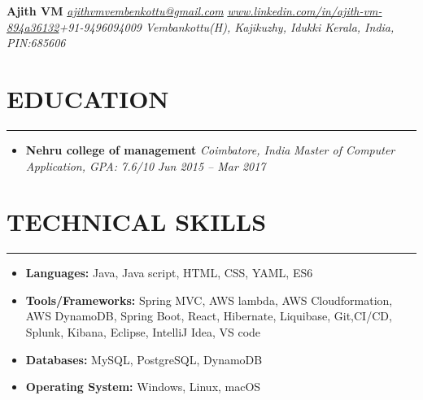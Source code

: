 \documentclass{article}
\begin{document}
	\noindent \textbf{\LARGE Ajith VM} \hfill \textcolor{cyan}{\underline{\textit{\href{mailto:ajithvmvembenkottu@gmail.com}{ajithvmvembenkottu@gmail.com}}}}\newline
	\textcolor{cyan}{\underline{\textit{\url{www.linkedin.com/in/ajith-vm-894a36132}}}}\hfill \textit{+91-9496094009}\newline
	\null\hfill \textit{Vembankottu(H), Kajikuzhy, Idukki \newline \null\hfill Kerala, India, PIN:685606}
	\section*{\normalsize EDUCATION}
	\rule{\textwidth}{1.6pt}
		\begin{itemize}
			\item \textbf{\normalsize Nehru college of management} \hfill \textit{Coimbatore, India} \newline \textit{Master of Computer Application, GPA: 7.6/10} \hfill \textit{Jun 2015 – Mar 2017}
		\end{itemize}
	\section*{\normalsize TECHNICAL SKILLS}
	\rule{\textwidth}{1.6pt}
		\begin{itemize}
			\item \textbf{Languages:} Java, Java script, HTML, CSS, YAML, ES6
			\item \textbf{Tools/Frameworks:} Spring MVC, AWS lambda, AWS Cloudformation, AWS DynamoDB, Spring Boot, React, Hibernate, Liquibase, Git,CI/CD, Splunk, Kibana, Eclipse, IntelliJ Idea, VS code
			\item \textbf{Databases:} MySQL, PostgreSQL, DynamoDB
			\item \textbf{Operating System:} Windows, Linux, macOS
		\end{itemize}
\end{document}
